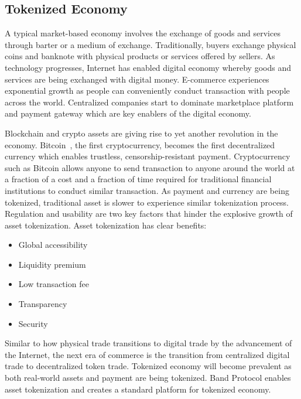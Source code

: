 \documentclass[letterpaper,11pt]{article}
\begin{document}
\subsection{Tokenized Economy}

A typical market-based economy involves the exchange of goods and services through barter or a medium of exchange. Traditionally, buyers exchange physical coins and banknote with physical products or services offered by sellers. As technology progresses, Internet has enabled digital economy whereby goods and services are being exchanged with digital money. E-commerce experiences exponential growth as people can conveniently conduct transaction with people across the world. Centralized companies start to dominate marketplace platform and payment gateway which are key enablers of the digital economy.

Blockchain and crypto assets are giving rise to yet another revolution in the economy. Bitcoin~\cite{nakamoto}, the first cryptocurrency, becomes the first decentralized currency which enables trustless, censorship-resistant payment. Cryptocurrency such as Bitcoin allows anyone to send transaction to anyone around the world at a fraction of a cost and a fraction of time required for traditional financial institutions to conduct similar transaction. As payment and currency are being tokenized, traditional asset is slower to experience similar tokenization process. Regulation and usability are two key factors that hinder the explosive growth of asset tokenization. Asset tokenization has clear benefits:
\begin{itemize}
\item Global accessibility
\item Liquidity premium
\item Low transaction fee
\item Transparency
\item Security
\end{itemize}

Similar to how physical trade transitions to digital trade by the advancement of the Internet, the next era of commerce is the transition from centralized digital trade to decentralized token trade. Tokenized economy will become prevalent as both real-world assets and payment are being tokenized. Band Protocol enables asset tokenization and creates a standard platform for tokenized economy.
\newpage
\end{document}
